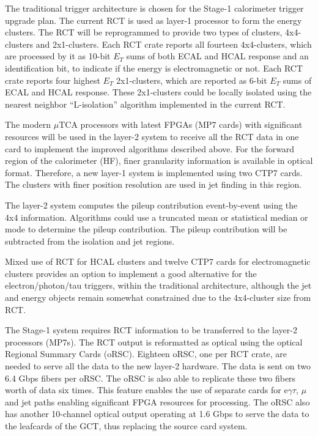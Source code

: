 The traditional trigger architecture is chosen for the Stage-1
calorimeter trigger upgrade plan.  The current RCT is
used as layer-1 processor to form the energy clusters.  The RCT will
be reprogrammed to provide two types of clusters, 4x4-clusters and
2x1-clusters.  Each RCT crate reports all fourteen 4x4-clusters, which
are processed by it as 10-bit $E_T$ sums of both ECAL and HCAL
response and an identification bit, to indicate if the energy is
electromagnetic or not.  Each RCT crate reports four highest $E_T$
2x1-clusters, which are reported as 6-bit $E_T$ sums of ECAL and HCAL
response.  These 2x1-clusters could be locally isolated using the
nearest neighbor ``L-isolation'' algorithm implemented in the current
RCT.

The modern $\mu$TCA processors with latest FPGAs (MP7 cards) with
significant resources will be used in the layer-2 system to receive
all the RCT data in one card to implement the improved algorithms
described above.  
For the forward region of the calorimeter (HF), finer granularity 
information is available in optical format.  Therefore, a new layer-1 
system is implemented using two CTP7 cards.  The clusters with finer
position resolution are used in jet finding in this region.

The layer-2 system computes the pileup contribution event-by-event
using the 4x4 information.  Algorithms could use a truncated mean
or statistical median or mode to determine the pileup contribution.
The pileup contribution will be subtracted from the isolation and
jet regions.

Mixed use of RCT for HCAL clusters and twelve CTP7 cards for
electromagnetic clusters provides an option to implement a good
alternative for the electron/photon/tau triggers, within the
traditional architecture, although the jet and energy objects remain
somewhat constrained due to the 4x4-cluster size from RCT.

The Stage-1 system requires RCT information to be transferred to the
layer-2 processors (MP7s).  The RCT output is reformatted as optical using the optical Regional Summary Cards (oRSC).
Eighteen oRSC, one per RCT crate, are needed to serve all the data
to the new layer-2 hardware.  The data is sent on two 6.4 Gbps fibers
per oRSC. The oRSC is also able to replicate these two fibers worth
of data six times.  This feature enables the use of separate 
cards for e$\gamma\tau$, $\mu$ and jet paths enabling significant
FPGA resources for processing.  The oRSC also has another 10-channel
optical output operating at 1.6 Gbps to serve the data to the leafcards
of the GCT, thus replacing the source card system.

